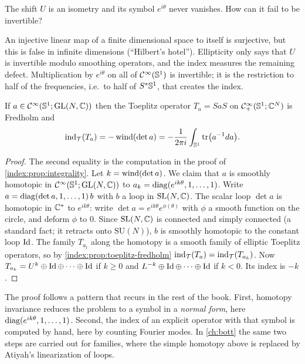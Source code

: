 \begin{question}
  The shift $U$ is an isometry and its symbol $e^{i\theta}$ never vanishes. How
  can it fail to be invertible?
\end{question}
\begin{answer}
  An injective linear map of a finite dimensional space to itself is surjective,
  but this is false in infinite dimensions (``Hilbert's hotel''). Ellipticity
  only says that $U$ is invertible modulo smoothing operators, and the index
  measures the remaining defect. Multiplication by $e^{i\theta}$ on all of
  $\mathcal{C}^\infty(\mathbb{S}^1)$ is invertible; it is the restriction to half of the
  frequencies, i.e.\ to half of $S^*\mathbb{S}^1$, that creates the index.
\end{answer}

\begin{theorem}\label{index:thm:toeplitz-index}
  If $a\in\mathcal{C}^\infty(\mathbb{S}^1;\operatorname{GL}(N,\mathbb{C}))$ then the Toeplitz operator $T_a=SaS$ on
  $\mathcal{C}^\infty_{+}(\mathbb{S}^1;\mathbb{C}^N)$ is Fredholm and
  \begin{equation*}
    \operatorname{ind}_{\mathcal T}(T_a)=-\operatorname{wind}(\det a)
    =-\frac1{2\pi i}\int_{\mathbb{S}^1}\operatorname{tr}\bigl(a^{-1}da\bigr).
  \end{equation*}
\end{theorem}
\begin{proof}
  The second equality is the computation in the proof of
  \cref{index:prop:integrality}. Let $k=\operatorname{wind}(\det a)$. We claim that $a$ is
  smoothly homotopic in $\mathcal{C}^\infty(\mathbb{S}^1;\operatorname{GL}(N,\mathbb{C}))$ to
  $a_k=\operatorname{diag}(e^{ik\theta},1,\dots,1)$. Write $a=\operatorname{diag}(\det a,1,\dots,1)\,b$
  with $b$ a loop in $\mathrm{SL}(N,\mathbb{C})$. The scalar loop $\det a$ is
  homotopic in $\mathbb{C}^*$ to $e^{ik\theta}$: write $\det
  a=e^{ik\theta}e^{\phi(\theta)}$ with $\phi$ a smooth function on the
  circle, and deform $\phi$ to $0$. Since $\mathrm{SL}(N,\mathbb{C})$ is connected and
  simply connected (a standard fact; it retracts onto $\mathrm{SU}(N)$), $b$ is
  smoothly homotopic to the constant loop $\operatorname{Id}$. The family
  $T_{a_t}$ along the homotopy is a smooth family of elliptic Toeplitz
  operators, so by \cref{index:prop:toeplitz-fredholm}
  $\operatorname{ind}_{\mathcal T}(T_a)=\operatorname{ind}_{\mathcal T}(T_{a_k})$. Now
  $T_{a_k}=U^k\oplus\operatorname{Id}\oplus\dots\oplus\operatorname{Id}$ if $k\ge0$ and
  $L^{-k}\oplus\operatorname{Id}\oplus\dots\oplus\operatorname{Id}$ if $k<0$. Its index is $-k$.
\end{proof}

\begin{discussion}
  The proof follows a pattern that recurs in the rest of the book. First,
  homotopy invariance reduces the problem to a symbol in a \emph{normal form},
  here $\operatorname{diag}(e^{ik\theta},1,\dots,1)$. Second, the index of an explicit operator
  with that symbol is computed by hand, here by counting Fourier modes. In
  \cref{ch:bott} the same two steps are carried out for families, where the
  simple homotopy above is replaced by Atiyah's linearization of loops.
\end{discussion}

